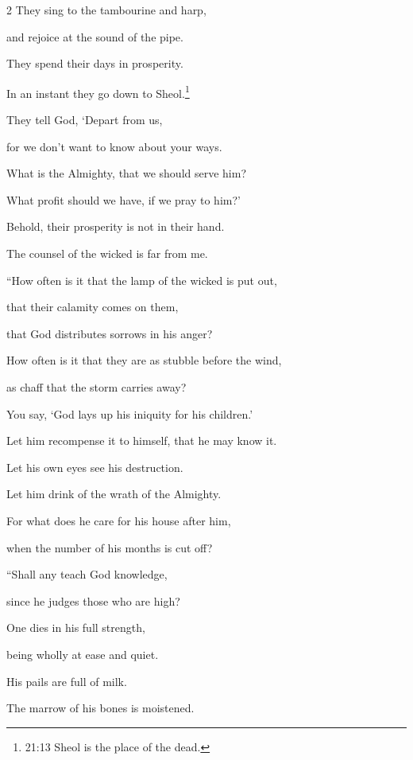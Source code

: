\begin{multicols}{2}
	\myverse{}They sing to the tambourine and harp,
	
	and rejoice at the sound of the pipe.
	
	\myverse{}They spend their days in prosperity.
	
	In an instant they go down to Sheol.\footnote{21:13 Sheol is the place of the dead.
	}
	
	\myverse{}They tell God, ‘Depart from us,
	
	for we don’t want to know about your ways.
	
	\myverse{}What is the Almighty, that we should serve him?
	
	What profit should we have, if we pray to him?’
	
	\myverse{}Behold, their prosperity is not in their hand.
	
	The counsel of the wicked is far from me.
	
	\vspace{\baselineskip}
	
	\myverse{}“How often is it that the lamp of the wicked is put out,
	
	that their calamity comes on them,
	
	that God distributes sorrows in his anger?
	
	\myverse{}How often is it that they are as stubble before the wind,
	
	as chaff that the storm carries away?
	
	\myverse{}You say, ‘God lays up his iniquity for his children.’
	
	Let him recompense it to himself, that he may know it.
	
	\myverse{}Let his own eyes see his destruction.
	
	Let him drink of the wrath of the Almighty.
	
	\myverse{}For what does he care for his house after him,
	
	when the number of his months is cut off?
	
		\vspace{\baselineskip}
	
	\myverse{}“Shall any teach God knowledge,
	
	since he judges those who are high?
	
	\myverse{}One dies in his full strength,
	
	being wholly at ease and quiet.
	
	\myverse{}His pails are full of milk.
	
	The marrow of his bones is moistened.
	

\end{multicols}
